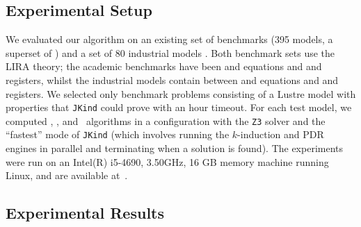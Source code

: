 \subsection{Experimental Setup}
We evaluated our algorithm on an existing set of benchmarks (395 models, a superset of \cite{piskac2016}) and a set of 80 industrial models \cite{NFM2015:backes, hilt2013}.   Both benchmark sets use the LIRA theory; the academic benchmarks have been  and  equations and  and  registers, whilst the industrial models contain between  and  equations and  and  registers.
We selected only benchmark problems consisting of a Lustre model with
properties that \texttt{JKind} could prove with an hour timeout.
For each test model, we computed \aivcalg, \ucalg, and \ucbfalg ~algorithms in a configuration with the \texttt{Z3} solver and the ``fastest'' mode of \texttt{JKind} (which involves running the $k$-induction and PDR engines in parallel and terminating when a solution is found). The experiments were run on an  Intel(R) i5-4690, 3.50GHz, 16 GB memory machine running Linux, and are available at~\cite{expr}.%



\subsection{Experimental Results}

 